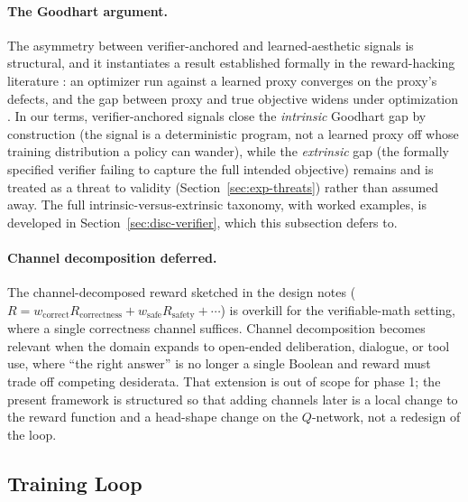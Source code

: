 \paragraph{The Goodhart argument.}
The asymmetry between verifier-anchored and learned-aesthetic signals
is structural, and it instantiates a result established formally in the
reward-hacking literature \citep{skalse2022reward, gao2023scaling}: an
optimizer run against a learned proxy converges on the proxy's defects,
and the gap between proxy and true objective widens under optimization
\citep{gao2023scaling}. In our terms, verifier-anchored signals close
the \emph{intrinsic} Goodhart gap by construction (the signal is a
deterministic program, not a learned proxy off whose training
distribution a policy can wander), while the \emph{extrinsic} gap (the
formally specified verifier failing to capture the full intended
objective) remains and is treated as a threat to validity
(Section~\ref{sec:exp-threats}) rather than assumed away. The full
intrinsic-versus-extrinsic taxonomy, with worked examples, is developed
in Section~\ref{sec:disc-verifier}, which this subsection defers to.

\paragraph{Channel decomposition deferred.}
The channel-decomposed reward sketched in the design notes
($R = w_{\text{correct}} R_{\text{correctness}} +
w_{\text{safe}} R_{\text{safety}} + \cdots$) is overkill for the
verifiable-math setting, where a single correctness channel suffices.
Channel decomposition becomes relevant when the domain expands to
open-ended deliberation, dialogue, or tool use, where ``the right
answer'' is no longer a single Boolean and reward must trade off
competing desiderata. That extension is out of scope for phase 1; the
present framework is structured so that adding channels later is a
local change to the reward function and a head-shape change on the
$Q$-network, not a redesign of the loop.

\subsection{Training Loop}
\label{sec:method-training}

